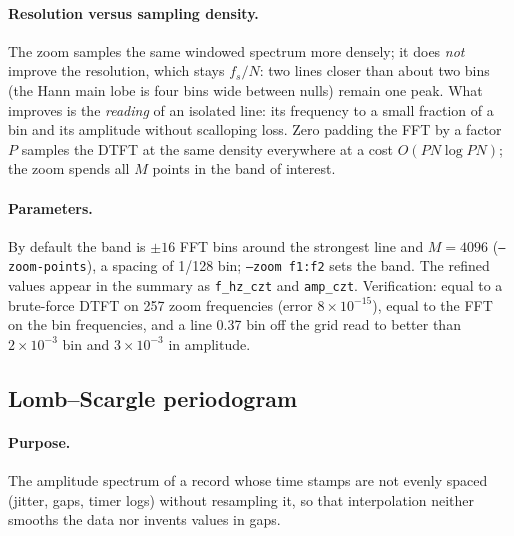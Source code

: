 \documentclass[10pt,letterpaper]{article}
\numberwithin{equation}{section}
\begin{document}
\paragraph{Resolution versus sampling density.} The zoom samples the same
windowed spectrum more densely; it does \emph{not} improve the resolution,
which stays $f_s/N$: two lines closer than about two bins (the Hann main lobe is
four bins wide between nulls) remain one peak. What improves is the
\emph{reading} of an isolated line: its frequency to a small fraction of a bin
and its amplitude without scalloping loss. Zero padding the FFT by a factor
$P$ samples the DTFT at the same density everywhere at a cost
$O(PN\log PN)$; the zoom spends all $M$ points in the band of interest.

\paragraph{Parameters.} By default the band is $\pm16$ FFT bins around the
strongest line and $M = 4096$ (\texttt{--zoom-points}), a spacing of 1/128 bin;
\texttt{--zoom f1:f2} sets the band. The refined values appear in the summary as
\texttt{f\_hz\_czt} and \texttt{amp\_czt}. Verification: equal to a brute-force
DTFT on 257 zoom frequencies (error $8\times10^{-15}$), equal to the FFT on the
bin frequencies, and a line 0.37 bin off the grid read to better than
$2\times10^{-3}$ bin and $3\times10^{-3}$ in amplitude.

\subsection{Lomb--Scargle periodogram}\label{sec:lomb}
\paragraph{Purpose.} The amplitude spectrum of a record whose time stamps are
not evenly spaced (jitter, gaps, timer logs) without resampling it, so that
interpolation neither smooths the data nor invents values in gaps.
\end{document}
